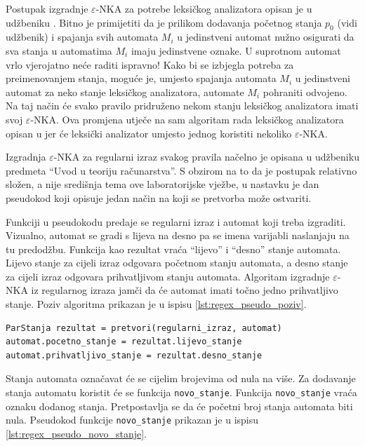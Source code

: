 \documentclass[times, 12pt, utf8]{book}
\begin{document}
Postupak izgradnje \(\varepsilon\)-NKA za potrebe leksičkog analizatora opisan je u udžbeniku \cite[poglavlje 2.9.2]{udzbenik}.
Bitno je primijetiti da je prilikom dodavanja početnog stanja \(p_0\) (vidi udžbenik) i spajanja svih automata \(M_i\) u jedinstveni automat nužno osigurati da sva stanja u automatima \(M_i\) imaju jedinstvene oznake.
U suprotnom automat vrlo vjerojatno neće raditi ispravno!
Kako bi se izbjegla potreba za preimenovanjem stanja, moguće je, umjesto spajanja automata \(M_i\) u jedinstveni automat za neko stanje leksičkog analizatora, automate \(M_i\) pohraniti odvojeno.
Na taj način će svako pravilo pridruženo nekom stanju leksičkog analizatora imati svoj \(\varepsilon\)-NKA.
Ova promjena utječe na sam algoritam rada leksičkog analizatora opisan u \cite[poglavlje 2.9.7]{udzbenik} jer će leksički analizator umjesto jednog koristiti nekoliko \(\varepsilon\)-NKA.

Izgradnja \(\varepsilon\)-NKA za regularni izraz svakog pravila načelno je opisana u udžbeniku predmeta ``Uvod u teoriju računarstva''.
S obzirom na to da je postupak relativno složen, a nije središnja tema ove laboratorijske vježbe, u nastavku je dan pseudokod koji opisuje jedan način na koji se pretvorba može ostvariti.

Funkciji u pseudokodu predaje se regularni izraz i automat koji treba izgraditi.
Vizualno, automat se gradi s lijeva na desno pa se imena varijabli naslanjaju na tu predodžbu.
Funkcija kao rezultat vraća ``lijevo'' i ``desno'' stanje automata.
Lijevo stanje za cijeli izraz odgovara početnom stanju automata, a desno stanje za cijeli izraz odgovara prihvatljivom stanju automata.
Algoritam izgradnje \(\varepsilon\)-NKA iz regularnog izraza jamči da će automat imati točno jedno prihvatljivo stanje.
Poziv algoritma prikazan je u ispisu \ref{lst:regex_pseudo_poziv}.

\begin{lstlisting}[caption={Poziv funkcije \texttt{pretvori}.},label=lst:regex_pseudo_poziv]
ParStanja rezultat = pretvori(regularni_izraz, automat)
automat.pocetno_stanje = rezultat.lijevo_stanje
automat.prihvatljivo_stanje = rezultat.desno_stanje
\end{lstlisting}

Stanja automata označavat će se cijelim brojevima od nula na više.
Za dodavanje stanja automatu koristit će se funkcija \verb|novo_stanje|.
Funkcija \verb|novo_stanje| vraća oznaku dodanog stanja.
Pretpostavlja se da će početni broj stanja automata biti nula.
Pseudokod funkcije \verb|novo_stanje| prikazan je u ispisu \ref{lst:regex_pseudo_novo_stanje}.
\end{document}
